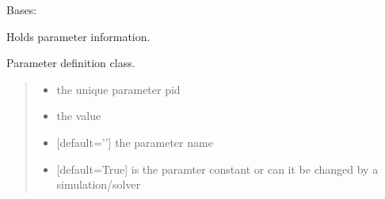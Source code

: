 \documentclass[letterpaper,12pt,english]{sphinxmanual}
\begin{document}
\begin{fulllineitems}
\label{\detokenize{api/core:cbmpy.CBModel.Parameter}}
\pysigstartsignatures
\pysiglinewithargsret
{}
{\sphinxparamcomma {}\sphinxparamcomma {}\sphinxparamcomma {}}
{}
\pysigstopsignatures
\sphinxAtStartPar
Bases: {\hyperref[\detokenize{api/core:cbmpy.CBModel.Fbase}]{}}

\sphinxAtStartPar
Holds parameter information.

\begin{fulllineitems}
\label{\detokenize{api/core:cbmpy.CBModel.Parameter.__init__}}
\pysigstartsignatures
\pysiglinewithargsret
{}
{\sphinxparamcomma {}\sphinxparamcomma {}\sphinxparamcomma {}}
{}
\pysigstopsignatures
\sphinxAtStartPar
Parameter definition class.
\begin{quote}\begin{description}
\begin{itemize}
\item {} 
\sphinxAtStartPar
{} \textendash{} the unique parameter pid

\item {} 
\sphinxAtStartPar
{} \textendash{} the value

\item {} 
\sphinxAtStartPar
{} \textendash{} {[}default=’’{]} the parameter name

\item {} 
\sphinxAtStartPar
{} \textendash{} {[}default=True{]} is the paramter constant or can it be changed by a simulation/solver


\end{itemize}
\end{description}
\end{quote}
\end{fulllineitems}
\end{fulllineitems}
\end{document}
